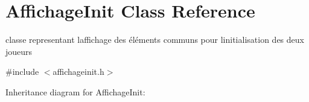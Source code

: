 \hypertarget{class_affichage_init}{}\section{Affichage\+Init Class Reference}
\label{class_affichage_init}


classe representant l\textquotesingle{}affichage des éléments communs pour l\textquotesingle{}initialisation des deux joueurs  




{\ttfamily \#include $<$affichageinit.\+h$>$}



Inheritance diagram for Affichage\+Init\+:
